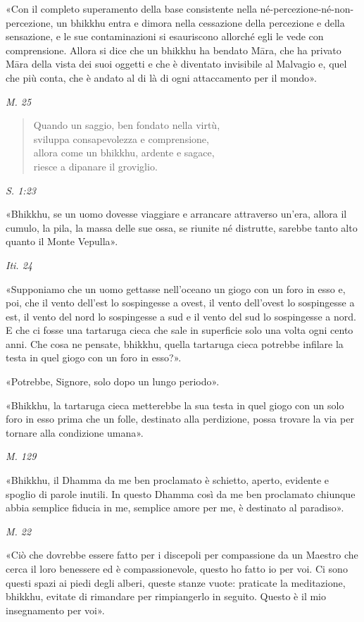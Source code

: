  «Con il completo superamento della base consistente nella
né-percezione-né-non-percezione, un bhikkhu entra e dimora nella
cessazione della percezione e della sensazione, e le sue contaminazioni
si esauriscono allorché egli le vede con comprensione. Allora si dice
che un bhikkhu ha bendato Māra, che ha privato Māra della vista dei suoi
oggetti e che è diventato invisibile al Malvagio e, quel che più conta,
che è andato al di là di ogni attaccamento per il mondo».


\emph{M. 25}


\begin{quote}
Quando un saggio, ben fondato nella virtù, \\
sviluppa consapevolezza e comprensione, \\
allora come un bhikkhu, ardente e sagace, \\
riesce a dipanare il groviglio.
\end{quote}

\emph{S. 1:23}


«Bhikkhu, se un uomo dovesse viaggiare e arrancare attraverso un’era,
allora il cumulo, la pila, la massa delle sue ossa, se riunite né
distrutte, sarebbe tanto alto quanto il Monte Vepulla».


\emph{Iti. 24}


«Supponiamo che un uomo gettasse nell’oceano un giogo con un foro in
esso e, poi, che il vento dell’est lo sospingesse a ovest, il vento
dell’ovest lo sospingesse a est, il vento del nord lo sospingesse a sud
e il vento del sud lo sospingesse a nord. E che ci fosse una tartaruga
cieca che sale in superficie solo una volta ogni cento anni. Che cosa ne
pensate, bhikkhu, quella tartaruga cieca potrebbe infilare la testa in
quel giogo con un foro in esso?».


«Potrebbe, Signore, solo dopo un lungo periodo».


«Bhikkhu, la tartaruga cieca metterebbe la sua testa in quel giogo con
un solo foro in esso prima che un folle, destinato alla perdizione,
possa trovare la via per tornare alla condizione umana».


\emph{M. 129}


«Bhikkhu, il Dhamma da me ben proclamato è schietto, aperto, evidente e
spoglio di parole inutili. In questo Dhamma così da me ben proclamato
chiunque abbia semplice fiducia in me, semplice amore per me, è
destinato al paradiso».


\emph{M. 22}


«Ciò che dovrebbe essere fatto per i discepoli per compassione da un
Maestro che cerca il loro benessere ed è compassionevole, questo ho
fatto io per voi. Ci sono questi spazi ai piedi degli alberi, queste
stanze vuote: praticate la meditazione, bhikkhu, evitate di rimandare
per rimpiangerlo in seguito. Questo è il mio insegnamento per voi».



